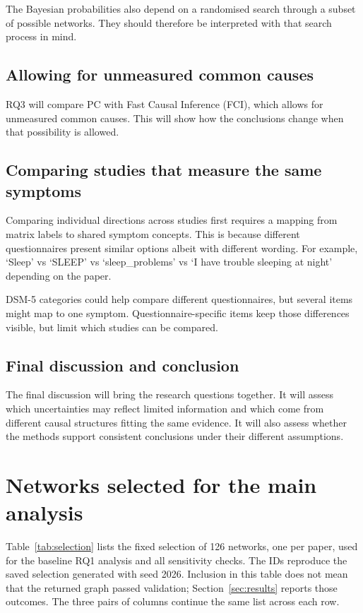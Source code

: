 \documentclass[11pt,a4paper]{article}
\begin{document}
The Bayesian probabilities also depend on a randomised search through a subset of possible networks. They should therefore be interpreted with that search process in mind.

\subsection{Allowing for unmeasured common causes}
RQ3 will compare PC with Fast Causal Inference (FCI), which allows for unmeasured common causes. This will show how the conclusions change when that possibility is allowed.

\subsection{Comparing studies that measure the same symptoms}
Comparing individual directions across studies first requires a mapping from matrix labels to shared symptom concepts. This is because different questionnaires present similar options albeit with different wording. For example, `Sleep' vs `SLEEP' vs `sleep\_problems' vs `I have trouble sleeping at night' depending on the paper. 

DSM-5 categories could help compare different questionnaires, but several items might map to one symptom. Questionnaire-specific items keep those differences visible, but limit which studies can be compared. 

\subsection{Final discussion and conclusion}
The final discussion will bring the research questions together. It will assess which uncertainties may reflect limited information and which come from different causal structures fitting the same evidence. It will also assess whether the methods support consistent conclusions under their different assumptions.

\clearpage
\appendix
\clearpage
\section{Networks selected for the main analysis}\label{app:selection}
Table~\ref{tab:selection} lists the fixed selection of 126 networks, one per paper, used for the baseline RQ1 analysis and all sensitivity checks. The IDs reproduce the saved selection generated with seed 2026. Inclusion in this table does not mean that the returned graph passed validation; Section~\ref{sec:results} reports those outcomes. The three pairs of columns continue the same list across each row.
\end{document}
